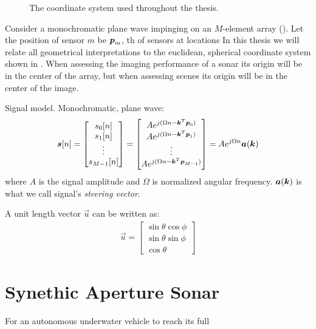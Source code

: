 \begin{figure}[th]
\caption{The coordinate system used throughout the thesis.}\label{geometry}
\end{figure}

Consider a monochromatic plane wave impinging on an $M$-element array (). Let the position of sensor $m$ be $\boldsymbol{p}_m$, th  of sensors at locations 
In this thesis we will relate all geometrical interpretations to the euclidean, spherical coordinate system shown in . When assessing the imaging performance of a sonar its origin will be in the center of the array, but when assessing scenes its origin will be in the center of the image. 

Signal model. Monochromatic, plane wave:
%
\begin{align}
\boldsymbol{s}[n] = \begin{bmatrix}
         s_0[n] \\ s_1[n] \\ \vdots \\ s_{M-1}[n]
        \end{bmatrix}
      = \begin{bmatrix}
         Ae^{j(\Omega n - \boldsymbol{k}^{\scriptscriptstyle T}\boldsymbol{p}_0)} \\
         Ae^{j(\Omega n - \boldsymbol{k}^{\scriptscriptstyle T}\boldsymbol{p}_1)} \\
         \vdots \\
         Ae^{j(\Omega n - \boldsymbol{k}^{\scriptscriptstyle T}\boldsymbol{p}_{M-1})}
        \end{bmatrix}
      = Ae^{j\Omega n}\boldsymbol{a}(\boldsymbol{k})
\end{align}
%
where $A$ is the signal amplitude and $\Omega$ is normalized angular frequency. $\boldsymbol{a}(\boldsymbol{k})$ is what we call signal's \emph{steering vector}.

A unit length vector $\vec u$ can be written as:
%
\begin{align*}
\vec u =
\begin{bmatrix}
\sin\theta \cos\phi \\
\sin\theta \sin\phi \\
\cos\theta
\end{bmatrix}
\end{align*}
%





\section{Synethic Aperture Sonar}

For an autonomous underwater vehicle to reach its full 

